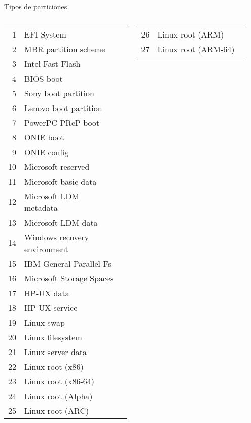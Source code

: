 \begin{frame}[c]{Tipos de particiones}
  \pausa
  {\tiny
  \begin{columns}
  \begin{table}[]
  \begin{tabular}{rll}
  1&EFI System                     \\
  2&MBR partition scheme           \\
  3&Intel Fast Flash               \\
  4&BIOS boot                      \\
  5&Sony boot partition            \\
  6&Lenovo boot partition          \\
  7&PowerPC PReP boot              \\
  8&ONIE boot                      \\
  9&ONIE config                    \\
 10&Microsoft reserved             \\
 11&Microsoft basic data           \\
 12&Microsoft LDM metadata         \\
 13&Microsoft LDM data             \\
 14&Windows recovery environment   \\
 15&IBM General Parallel Fs        \\
 16&Microsoft Storage Spaces       \\
 17&HP-UX data                     \\
 18&HP-UX service                  \\
 19&Linux swap                     \\
 20&Linux filesystem               \\
 21&Linux server data              \\
 22&Linux root (x86)               \\
 23&Linux root (x86-64)            \\
 24&Linux root (Alpha)             \\
 25&Linux root (ARC)               \\
  \end{tabular}
  \end{table}
  \begin{table}[]
  \begin{tabular}{rll}
 26&Linux root (ARM)               \\
 27&Linux root (ARM-64)            \\

\end{tabular}
\end{table}
\end{columns}}
\end{frame}
